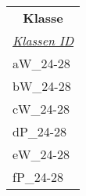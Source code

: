 \documentclass{standalone}
\begin{document}
\begin{tabular}{|l|}
    \hline
    \multicolumn{1}{|c|}{\cellcolor[HTML]{C0C0C0} \textbf{Klasse}} \\
    \textit{\underline{Klassen ID}} \\ \hline
    aW\_24-28\\
    bW\_24-28\\
    cW\_24-28\\
    dP\_24-28\\
    eW\_24-28\\
    fP\_24-28\\
    \hline
    \end{tabular}
\end{document}
